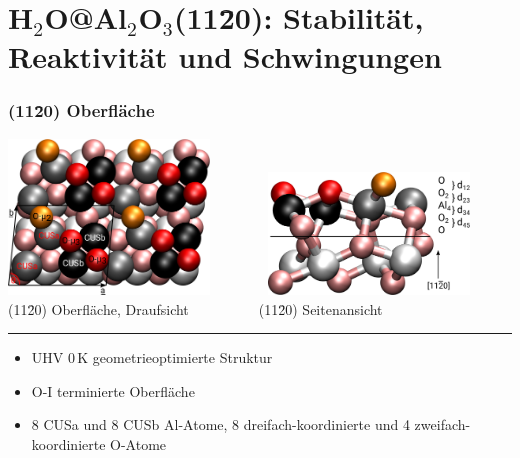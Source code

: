 \documentclass[hyperref={pdfpagelabels=false}]{beamer}
\begin{document}
\section{H$_2$O@Al$_2$O$_3$(11\=20): Stabilität, Reaktivität und Schwingungen}
\begin{frame}
 \frametitle{(11\=20) Oberfläche}
\includegraphics[width=0.4\textwidth]{figures/supercell_opt.png}~ ~ ~ ~ ~
\includegraphics[width=0.4\textwidth]{figures/uc_opt.png}\\
(11\=20) Oberfläche, Draufsicht~ ~ ~~~~~~ (11\=20) Seitenansicht
\newline
 \hrule
 \begin{itemize}
  \item UHV $0\,$K geometrieoptimierte Struktur
  \item O-I terminierte Oberfläche
  \item 8 CUSa und 8 CUSb Al-Atome, 8 dreifach-koordinierte und 4 zweifach-koordinierte O-Atome
 \end{itemize}
 \end{frame}
\end{document}
